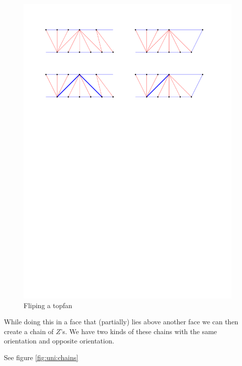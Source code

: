 \begin{figure}[h]
  \centering
  \includegraphics[width = \textwidth]{unifiedAlgo/img/post/topFanFlips}
  \caption{Fliping a topfan}
  \label{fig:uni:topFanFlips}
\end{figure}


While doing this in a face that (partially) lies above another face we can then create a chain of $Z$'s. We have two kinds of these chains with the same orientation and opposite orientation.

See figure \ref{fig:uni:chains}

